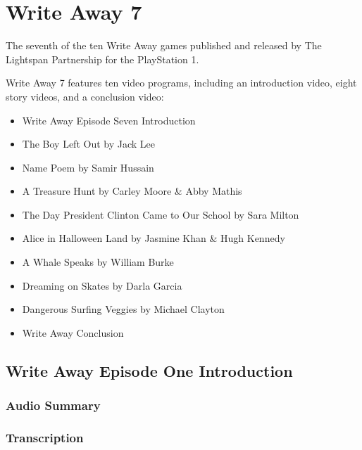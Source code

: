 \chapter{Write Away 7}


The seventh of the ten Write Away games published and released by The Lightspan Partnership for the PlayStation 1.

Write Away 7 features ten video programs, including an introduction video, eight story videos, and a conclusion video:

\begin{itemize}
    \item Write Away Episode Seven Introduction
    \item The Boy Left Out by Jack Lee
    \item Name Poem by Samir Hussain
    \item A Treasure Hunt by Carley Moore \& Abby Mathis
    \item The Day President Clinton Came to Our School by Sara Milton
    \item Alice in Halloween Land by Jasmine Khan \& Hugh Kennedy
    \item A Whale Speaks by William Burke
    \item Dreaming on Skates by Darla Garcia
    \item Dangerous Surfing Veggies by Michael Clayton
    \item Write Away Conclusion
\end{itemize}

\clearpage
\newpage

\section{Write Away Episode One Introduction}

\subsection{Audio Summary}

\subsection{Transcription}

